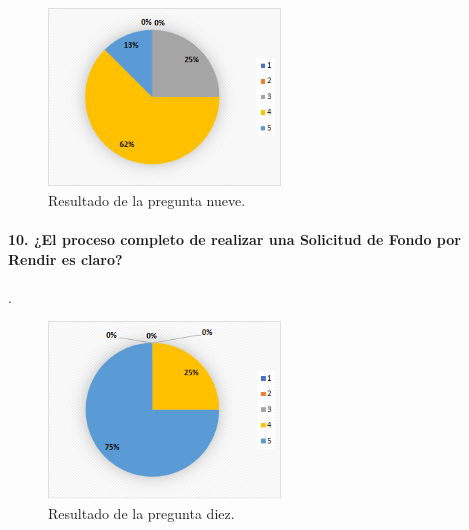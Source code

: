 \begin{figure}[h]
    \centering
    \includegraphics[width=0.55\textwidth]{Imagenes/Pregunta9.png}
    \caption{\label{fig: Pregunta9}Resultado de la pregunta nueve.}
\end{figure}

\paragraph{10. ¿El proceso completo de realizar una Solicitud de Fondo por Rendir es claro?}.

\begin{figure}[h]
    \centering
    \includegraphics[width=0.55\textwidth]{Imagenes/Pregunta10.png}
    \caption{\label{fig: Pregunta10}Resultado de la pregunta diez.}
\end{figure}






